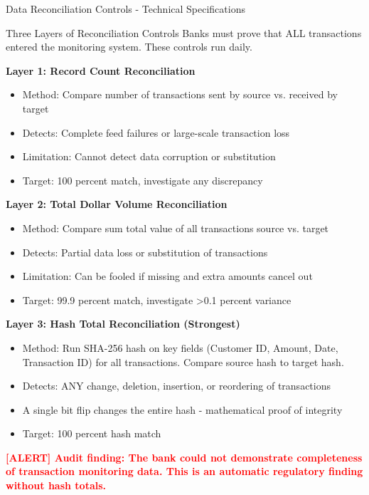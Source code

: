 \documentclass[11pt,a4paper]{beamer}
\newcommand{\redflag}[1]{\textcolor{red}{\textbf{[ALERT] #1}}}
\begin{document}
	\begin{frame}{Data Reconciliation Controls - Technical Specifications}
		\begin{block}{Three Layers of Reconciliation Controls}
			Banks must prove that ALL transactions entered the monitoring system. These controls run daily.
		\end{block}
		
		\textbf{Layer 1: Record Count Reconciliation}
		\begin{itemize}
			\item Method: Compare number of transactions sent by source vs. received by target
			\item Detects: Complete feed failures or large-scale transaction loss
			\item Limitation: Cannot detect data corruption or substitution
			\item Target: 100 percent match, investigate any discrepancy
		\end{itemize}
		
		\textbf{Layer 2: Total Dollar Volume Reconciliation}
		\begin{itemize}
			\item Method: Compare sum total value of all transactions source vs. target
			\item Detects: Partial data loss or substitution of transactions
			\item Limitation: Can be fooled if missing and extra amounts cancel out
			\item Target: 99.9 percent match, investigate >0.1 percent variance
		\end{itemize}
		
		\textbf{Layer 3: Hash Total Reconciliation (Strongest)}
		\begin{itemize}
			\item Method: Run SHA-256 hash on key fields (Customer ID, Amount, Date, Transaction ID) for all transactions. Compare source hash to target hash.
			\item Detects: ANY change, deletion, insertion, or reordering of transactions
			\item A single bit flip changes the entire hash - mathematical proof of integrity
			\item Target: 100 percent hash match
		\end{itemize}
		
		\redflag{Audit finding: The bank could not demonstrate completeness of transaction monitoring data. This is an automatic regulatory finding without hash totals.}
	\end{frame}
	
\end{document}
